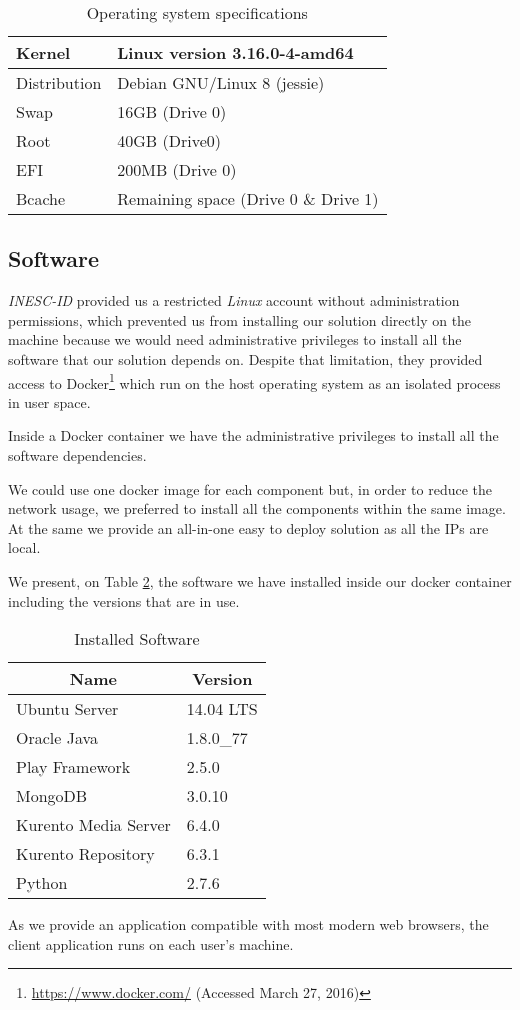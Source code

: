 	\begin{table}
\centering
\caption{Operating system specifications}
\label{table:osspecs}
\begin{tabular}{|l|l|}
\hline
Kernel & Linux version 3.16.0-4-amd64 \\ \hline
Distribution & Debian GNU/Linux 8 (jessie)\footnotemark \\ \hline
Swap & 16GB (Drive 0)\\ \hline
Root & 40GB (Drive0)\\ \hline
EFI & 200MB (Drive 0)\\ \hline
Bcache & Remaining space (Drive 0 \& Drive 1) \\ \hline
\end{tabular}
\end{table}


\subsection{Software}
	\emph{INESC-ID} provided us a restricted \emph{Linux} account without administration permissions, which prevented us from installing our solution directly on the machine because we would need administrative privileges to install all the software that our solution depends on. Despite that limitation, they provided access to Docker\footnote{\url{https://www.docker.com/} (Accessed March 27, 2016)} which run on the host operating system as an isolated process in user space.

	Inside a Docker container we have the administrative privileges to install all the software dependencies.

	We could use one docker image for each component but, in order to reduce the network usage, we preferred to install all the components within the same image. At the same we provide an all-in-one easy to deploy solution as all the \ac{IP}s are local.

	We present, on Table \ref{table:softspecs}, the software we have installed inside our docker container including the versions that are in use.

	\begin{table}
\centering
\caption{Installed Software}
\label{table:softspecs}
\begin{tabular}{|l|l|}
\hline
\multicolumn{1}{|c|}{\textbf{Name}} & \multicolumn{1}{c|}{\textbf{Version}}         \\ \hline
Ubuntu Server\footnotemark & 14.04 LTS   \\ \hline
Oracle Java & 1.8.0\_77   \\ \hline
Play Framework & 2.5.0  \\ \hline
MongoDB & 3.0.10   \\ \hline
Kurento Media Server & 6.4.0 \\ \hline
Kurento Repository & 6.3.1 \\ \hline
Python & 2.7.6 \\ \hline
\end{tabular}
\end{table}

 As we provide an application compatible with most modern web browsers, the client application runs on each user's machine.

